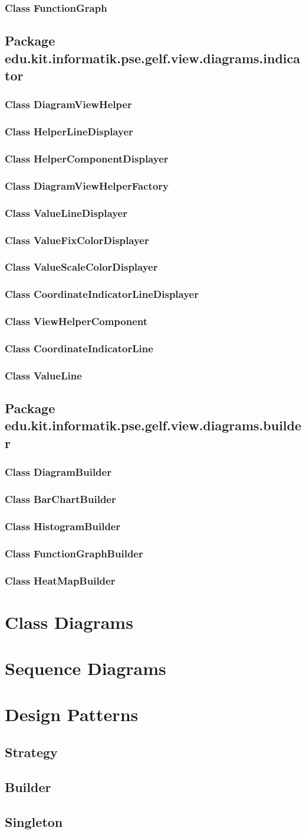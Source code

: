 \documentclass[10pt,a4paper]{report}
\newcommand{\desc}[3]{
    #1{#2 #3}
}
\newcommand{\classdesc}[1]{
    \desc{\subsection}{Class}{#1}
}
\newcommand{\absclassdesc}[1]{
    \desc{\subsection}{Class}{#1}
}
\newcommand{\packagedesc}[1]{
    \desc{\section}{Package}{#1}
}
\newcommand{\patternentry}[2]{
    #1{#2}
}
\newcommand{\pattern}[1]{
    \patternentry{\section}{#1}
}
\begin{document}
\classdesc{FunctionGraph}

\packagedesc{edu.kit.informatik.pse.gelf.view.diagrams.indicator}

\absclassdesc{DiagramViewHelper}

\absclassdesc{HelperLineDisplayer}

\absclassdesc{HelperComponentDisplayer}

\classdesc{DiagramViewHelperFactory}

\classdesc{ValueLineDisplayer}

\classdesc{ValueFixColorDisplayer}

\classdesc{ValueScaleColorDisplayer}

\classdesc{CoordinateIndicatorLineDisplayer}

\classdesc{ViewHelperComponent}

\classdesc{CoordinateIndicatorLine}

\classdesc{ValueLine}

\packagedesc{edu.kit.informatik.pse.gelf.view.diagrams.builder}

\absclassdesc{DiagramBuilder}

\classdesc{BarChartBuilder}

\classdesc{HistogramBuilder}

\classdesc{FunctionGraphBuilder}

\classdesc{HeatMapBuilder}

\chapter{Class Diagrams}

\chapter{Sequence Diagrams}

\chapter{Design Patterns}
\pattern{Strategy}
\pattern{Builder}
\pattern{Singleton}
\end{document}
